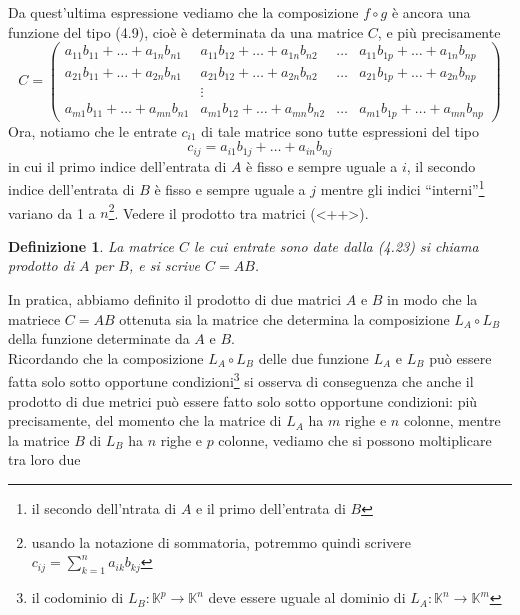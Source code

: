 \documentclass{book}
\newtheorem{definizione}{Definizione}
\begin{document}
Da quest'ultima espressione vediamo che la composizione $f\circ g$ è ancora una funzione del tipo
(4.9), cioè è determinata da una matrice $C$, e più precisamente
\begin{equation}
  \label{eq:4.22}
  C=
  \begin{pmatrix}
    a_{11}b_{11}+\dots+a_{1n}b_{n1}&a_{11}b_{12}+\dots+a_{1n}b_{n2}&\dots & a_{11}b_{1p}+\dots+a_{1n}b_{np}\\
    a_{21}b_{11}+\dots+a_{2n}b_{n1}&a_{21}b_{12}+\dots+a_{2n}b_{n2}&\dots & a_{21}b_{1p}+\dots+a_{2n}b_{np}\\
    &\vdots\\
    a_{m1}b_{11}+\dots+a_{mn}b_{n1}&a_{m1}b_{12}+\dots+a_{mn}b_{n2}&\dots & a_{m1}b_{1p}+\dots+a_{mn}b_{np}
  \end{pmatrix}
\end{equation}
Ora, notiamo che le entrate $c_{i1}$ di tale matrice sono tutte espressioni del tipo
\begin{equation}
  \label{eq:4.23}
  c_{ij}=a_{i1}b_{1j}+\dots+a_{in}b_{nj}
\end{equation}
in cui il primo indice dell'entrata di $A$ è fisso e sempre uguale a $i$, il secondo indice
dell'entrata di $B$ è fisso e sempre uguale a $j$ mentre gli indici ``interni''\footnote{il
  secondo dell'ntrata di $A$ e il primo dell'entrata di $B$} variano da 1 a $n$\footnote{usando
  la notazione di sommatoria, potremmo quindi scrivere $c_{ij}=\displaystyle\sum^n_{k=1}a_{ik}
  b_{kj}$}. Vedere il prodotto tra matrici (<++>).
\begin{definizione}
  La matrice $C$ le cui entrate sono date dalla (4.23) si chiama \textit{prodotto di} $A$ per
  $B$, e si scrive $C=AB$.
\end{definizione}
In pratica, abbiamo definito il prodotto di due matrici $A$ e $B$ in modo che la matriece $C=AB$
ottenuta sia la matrice che determina la composizione $L_A\circ L_B$ della funzione determinate
da $A$ e $B$.\\
Ricordando che la composizione $L_A\circ L_B$ delle due funzione $L_A$ e $L_B$ può essere fatta
solo sotto opportune condizioni\footnote{il codominio di $L_B:\mathbb{K}^p\to\mathbb{K}^n$ deve
  essere uguale al dominio di $L_A:\mathbb{K}^n\to\mathbb{K}^m$} si osserva di conseguenza che
anche il prodotto di due metrici può essere fatto solo sotto opportune condizioni: più
precisamente, del momento che la matrice di $L_A$ ha $m$ righe e $n$ colonne, mentre la matrice
$B$ di $L_B$ ha $n$ righe e $p$ colonne, vediamo che si possono moltiplicare tra loro due
\end{document}
